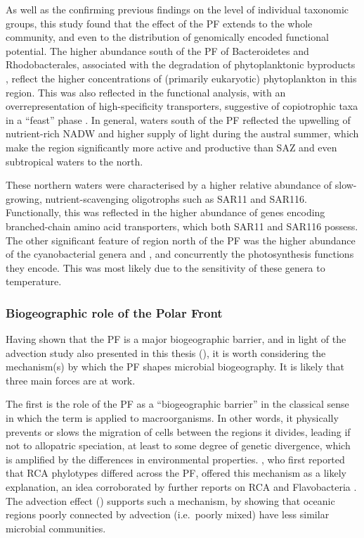 As well as the confirming previous findings on the level of individual taxonomic groups, this study found that the effect of the \ac{PF} extends to the whole community, and even to the distribution of genomically encoded functional potential.
The higher abundance south of the \ac{PF} of Bacteroidetes and Rhodobacterales, associated with the degradation of phytoplanktonic byproducts \citep[e.g.][]{Buchan:2005hd,Williams:2012gsa}, reflect the higher concentrations of (primarily eukaryotic) phytoplankton in this region. 
This was also reflected in the functional analysis, with an overrepresentation of high-specificity transporters, suggestive of copiotrophic taxa in a ``feast'' phase \cite{Lauro:2009gx}.
In general, waters south of the \ac{PF} reflected the upwelling of nutrient-rich \ac{NADW} and higher supply of light during the austral summer, which make the region significantly more active and productive than \ac{SAZ} and even subtropical waters to the north.

These northern waters were characterised by a higher relative abundance of slow-growing, nutrient-scavenging oligotrophs such as SAR11 and SAR116.
Functionally, this was reflected in the higher abundance of genes encoding branched-chain amino acid transporters, which both SAR11 and SAR116 possess.
The other significant feature of region north of the \ac{PF} was the higher abundance of the cyanobacterial genera  and , and concurrently the photosynthesis functions they encode.
This was most likely due to the sensitivity of these genera to temperature.

\subsubsection{Biogeographic role of the Polar Front}

Having shown that the \ac{PF} is a major biogeographic barrier, and in light of the advection study also presented in this thesis (), it is worth considering the mechanism(s) by which the \ac{PF} shapes microbial biogeography.
It is likely that three main forces are at work.

The first is the role of the \ac{PF} as a ``biogeographic barrier'' in the classical sense in which the term is applied to macroorganisms.
In other words, it physically prevents or slows the migration of cells between the regions it divides, leading if not to allopatric speciation, at least to some degree of genetic divergence, which is amplified by the differences in environmental properties.
\citet{Selje:2004ka}, who first reported that \ac{RCA} phylotypes differed across the \ac{PF}, offered this mechanism as a likely explanation, an idea corroborated by further reports on RCA \cite{Giebel:2009hr} and Flavobacteria \cite{Abell:2005ji}.
The advection effect () supports such a mechanism, by showing that oceanic regions poorly connected by advection (i.e.\ poorly mixed) have less similar microbial communities.

